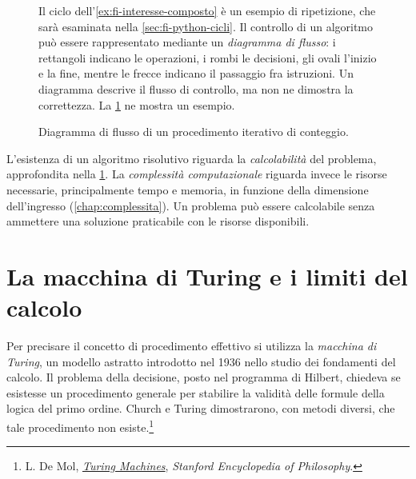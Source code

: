 \begin{figure}[htbp]
  \begin{minipage}[c]{0.57\textwidth}
    Il ciclo dell'\cref{ex:fi-interesse-composto} è un esempio di
    ripetizione, che sarà esaminata nella \cref{sec:fi-python-cicli}.
    Il controllo di un algoritmo può essere rappresentato mediante un
    \emph{diagramma di flusso}: i rettangoli indicano le operazioni, i
    rombi le decisioni, gli ovali l'inizio e la fine, mentre le frecce
    indicano il passaggio fra istruzioni. Un diagramma descrive il flusso
    di controllo, ma non ne dimostra la correttezza. La
    \cref{fig:fi-diagramma-conteggio} ne mostra un esempio.
  \end{minipage}
  \hfill
  \begin{minipage}[c]{0.32\textwidth}
    \centering
    \resizebox{0.85\linewidth}{!}{%
    }
    \caption{Diagramma di flusso di un procedimento iterativo di conteggio.}
    \label{fig:fi-diagramma-conteggio}
  \end{minipage}
\end{figure}

L'esistenza di un algoritmo risolutivo riguarda la
\emph{calcolabilità} del problema, approfondita nella
\cref{sec:fi-macchina-turing}.
La \emph{complessità computazionale} riguarda invece le risorse
necessarie, principalmente tempo e memoria, in funzione della
dimensione dell'ingresso (\cref{chap:complessita}). Un problema può
essere calcolabile senza ammettere una soluzione praticabile con le
risorse disponibili.

\clearpage

\section{La macchina di Turing e i limiti del calcolo}
\label{sec:fi-macchina-turing}

Per precisare il concetto di procedimento effettivo si utilizza la
\emph{macchina di Turing}, un modello astratto introdotto nel 1936
nello studio dei fondamenti del calcolo. Il problema della decisione,
posto nel programma di Hilbert, chiedeva se esistesse un procedimento generale
per stabilire la validità delle formule della logica del primo ordine.
Church e Turing dimostrarono, con metodi diversi, che tale procedimento
non esiste.\footnote{L. De Mol,
\href{https://plato.stanford.edu/entries/turing-machine/}
{\emph{Turing Machines}}, \emph{Stanford Encyclopedia of Philosophy}.}

